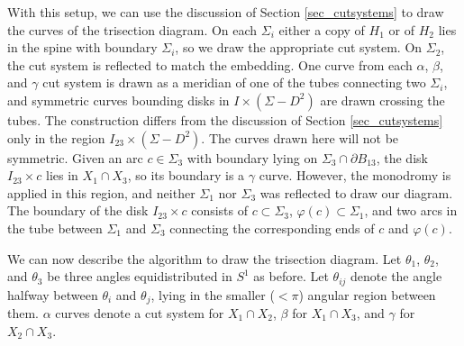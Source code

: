 \documentclass[12pt]{amsart}
\newcommand{\del}{\partial }
\theoremstyle{definition}
\theoremstyle{remark}
\begin{document}
With this setup, we can use the discussion of Section \ref{sec_cutsystems} to draw the curves of the trisection diagram.  On each $\Sigma_i$ either a copy of $H_1$ or of $H_2$ lies in the spine with boundary $\Sigma_i$, so we draw the appropriate cut system.  On $\Sigma_2$, the cut system is reflected to match the embedding.  One curve from each $\alpha$, $\beta$, and $\gamma$ cut system is drawn as a meridian of one of the tubes connecting two $\Sigma_i$, and symmetric curves bounding disks in $I \times (\Sigma - D^2)$ are drawn crossing the tubes.  The construction differs from the discussion of Section \ref{sec_cutsystems} only in the region $I_{23} \times (\Sigma - D^2)$.  The curves drawn here will not be symmetric.  Given an arc $c \in \Sigma_3$ with boundary lying on $\Sigma_3 \cap \del B_{13}$, the disk $I_{23} \times c$ lies in $X_1 \cap X_3$, so its boundary is a $\gamma$ curve.  However, the monodromy is applied in this region, and neither $\Sigma_1$ nor $\Sigma_3$ was reflected to draw our diagram.  The boundary of the disk $I_{23} \times c$ consists of $c \subset \Sigma_3$, $\varphi(c) \subset \Sigma_1$, and two arcs in the tube between $\Sigma_1$ and $\Sigma_3$ connecting the corresponding ends of $c$ and $\varphi(c)$.  

We can now describe the algorithm to draw the trisection diagram.  Let $\theta_1$, $\theta_2$, and $\theta_3$ be three angles equidistributed in $S^1$ as before.  Let $\theta_{ij}$ denote the angle halfway between $\theta_i$ and $\theta_j$, lying in the smaller ($<\pi$) angular region between them.  $\alpha$ curves denote a cut system for $X_1 \cap X_2$, $\beta$ for $X_1 \cap X_3$, and $\gamma$ for $X_2 \cap X_3$.
\end{document}
